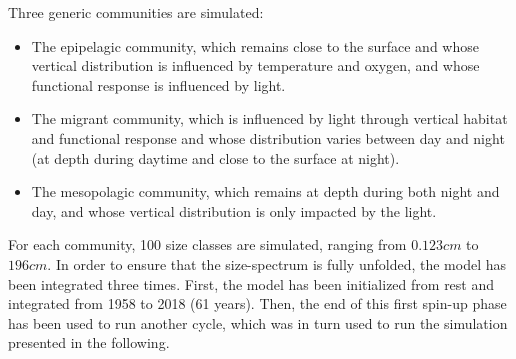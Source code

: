 %
%

Three generic communities are simulated:
\begin{itemize}
\item{The epipelagic community, which remains close to the surface and whose vertical distribution is influenced by temperature and oxygen, and whose functional response is influenced by light.}
\item{The migrant community, which is influenced by light through vertical habitat and functional response and whose distribution varies between day and night (at depth during daytime and close to the surface at night).}
\item{The  mesopolagic community, which remains at depth during both night and day, and whose vertical distribution is only impacted by the light.}
\end{itemize}

For each community, 100 size classes are simulated, ranging from $0.123cm$ to $196cm$. In order to ensure that the size-spectrum is fully unfolded, the model has been integrated three times. First, the model has been initialized from rest and integrated from 1958 to 2018 (61 years). Then, the end of this first spin-up phase has been used to run another cycle, which was in turn used to run the simulation presented in the following.


